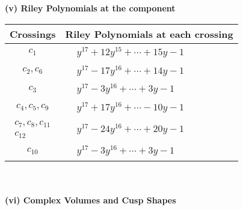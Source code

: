 \documentclass[1p]{elsarticle_modified}
\theoremstyle{definition}
\begin{document}
\newpage\renewcommand{\arraystretch}{1}
\flushleft \textbf{(v) Riley Polynomials at the component}\newline \\
\begin{tabular}{m{50pt}|m{274pt}}
Crossings & \hspace{64pt}Riley Polynomials at each crossing \\
\hline $$\begin{aligned}c_{1}\end{aligned}$$&$\begin{aligned}
&y^{17}+12 y^{15}+\cdots+15 y-1
\end{aligned}$\\
\hline $$\begin{aligned}c_{2},c_{6}\end{aligned}$$&$\begin{aligned}
&y^{17}-17 y^{16}+\cdots+14 y-1
\end{aligned}$\\
\hline $$\begin{aligned}c_{3}\end{aligned}$$&$\begin{aligned}
&y^{17}-3 y^{16}+\cdots+3 y-1
\end{aligned}$\\
\hline $$\begin{aligned}c_{4},c_{5},c_{9}\end{aligned}$$&$\begin{aligned}
&y^{17}+17 y^{16}+\cdots-10 y-1
\end{aligned}$\\
\hline $$\begin{aligned}c_{7},c_{8},c_{11}\\c_{12}\end{aligned}$$&$\begin{aligned}
&y^{17}-24 y^{16}+\cdots+20 y-1
\end{aligned}$\\
\hline $$\begin{aligned}c_{10}\end{aligned}$$&$\begin{aligned}
&y^{17}-3 y^{16}+\cdots+3 y-1
\end{aligned}$\\
\hline
\end{tabular}\\~\\
\newpage\flushleft \textbf{(vi) Complex Volumes and Cusp Shapes}
\end{document}
